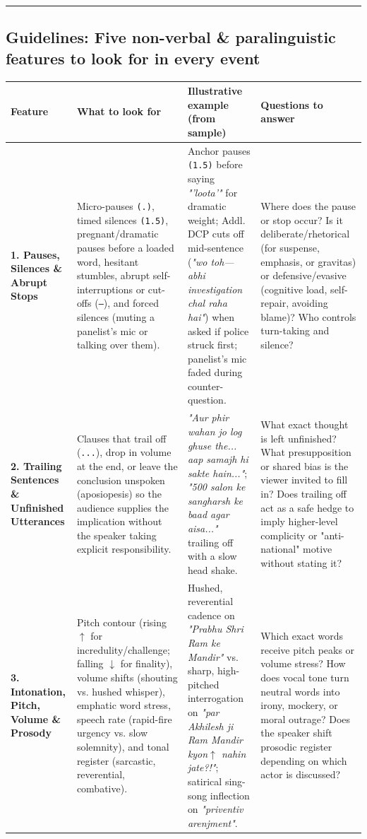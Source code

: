 \documentclass[10pt,a4paper]{article}
\begin{document}
\bigskip\hrule\bigskip

\subsection*{Guidelines: Five non-verbal \& paralinguistic features to look for in every event}

\begin{longtable}{|p{}|p{}|p{}|p{}|}
\hline
Feature & What to look for & Illustrative example (from sample) & Questions to answer \\ \hline \endhead
\textbf{1. Pauses, Silences \& Abrupt Stops} & Micro-pauses \texttt{(.)}, timed silences \texttt{(1.5)}, pregnant/dramatic pauses before a loaded word, hesitant stumbles, abrupt self-interruptions or cut-offs (\texttt{---}), and forced silences (muting a panelist's mic or talking over them). & Anchor pauses \texttt{(1.5)} before saying \textit{"'loota'"} for dramatic weight; Addl. DCP cuts off mid-sentence (\textit{"wo toh--- abhi investigation chal raha hai"}) when asked if police struck first; panelist's mic faded during counter-question. & Where does the pause or stop occur? Is it deliberate/rhetorical (for suspense, emphasis, or gravitas) or defensive/evasive (cognitive load, self-repair, avoiding blame)? Who controls turn-taking and silence? \\ \hline
\textbf{2. Trailing Sentences \& Unfinished Utterances} & Clauses that trail off (\texttt{...}), drop in volume at the end, or leave the conclusion unspoken (aposiopesis) so the audience supplies the implication without the speaker taking explicit responsibility. & \textit{"Aur phir wahan jo log ghuse the... aap samajh hi sakte hain..."}; \textit{"500 salon ke sangharsh ke baad agar aisa..."} trailing off with a slow head shake. & What exact thought is left unfinished? What presupposition or shared bias is the viewer invited to fill in? Does trailing off act as a safe hedge to imply higher-level complicity or "anti-national" motive without stating it? \\ \hline
\textbf{3. Intonation, Pitch, Volume \& Prosody} & Pitch contour (rising \texttt{$\uparrow$} for incredulity/challenge; falling \texttt{$\downarrow$} for finality), volume shifts (shouting vs. hushed whisper), emphatic word stress, speech rate (rapid-fire urgency vs. slow solemnity), and tonal register (sarcastic, reverential, combative). & Hushed, reverential cadence on \textit{"Prabhu Shri Ram ke Mandir"} vs. sharp, high-pitched interrogation on \textit{"par Akhilesh ji Ram Mandir kyon$\uparrow$ nahin jate?!"}; satirical sing-song inflection on \textit{"priventiv arenjment"}. & Which exact words receive pitch peaks or volume stress? How does vocal tone turn neutral words into irony, mockery, or moral outrage? Does the speaker shift prosodic register depending on which actor is discussed? \\ \hline

\end{longtable}
\end{document}
